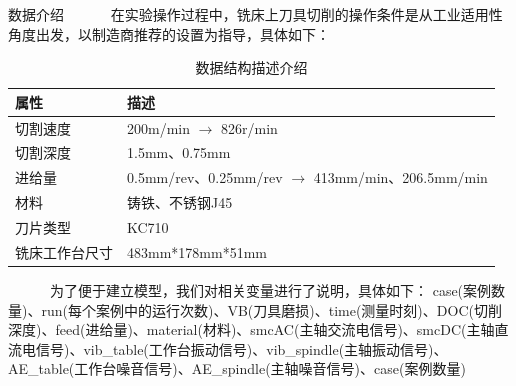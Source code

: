 \begin{frame}{数据介绍}
\ \ \ \ \ \ 在实验操作过程中，铣床上刀具切削的操作条件是从工业适用性角度出发，以制造商推荐的设置为指导，具体如下：
\begin{table}[!h]
\centering
\caption{数据结构描述介绍}
\begin{tabular}{|p{}|p{}|}
\hline 
 属性 & 描述 \\
\hline 
 切割速度 & 200m/min $\displaystyle \rightarrow $ 826r/min \\
 切割深度 & 1.5mm、0.75mm \\
 进给量 & 0.5mm/rev、0.25mm/rev $\displaystyle \rightarrow $ 413mm/min、206.5mm/min \\
 材料 & 铸铁、不锈钢J45 \\
 刀片类型 & KC710 \\
 铣床工作台尺寸 & 483mm*178mm*51mm \\
 \hline
\end{tabular}
\end{table}
% 
\ \ \ \ \ \ 为了便于建立模型，我们对相关变量进行了说明，具体如下：
% 
case(案例数量)、run(每个案例中的运行次数)、VB(刀具磨损)、time(测量时刻)、DOC(切削深度)、feed(进给量)、material(材料)、smcAC(主轴交流电信号)、smcDC(主轴直流电信号)、vib\_table(工作台振动信号)、vib\_spindle(主轴振动信号)、AE\_table(工作台噪音信号)、AE\_spindle(主轴噪音信号)、case(案例数量)
\end{frame}
% 
% 
